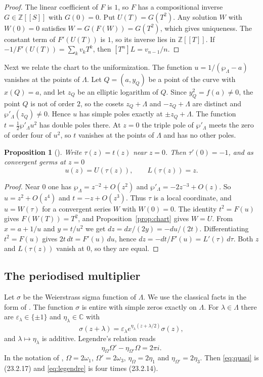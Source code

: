 \documentclass[11pt]{amsart}
\newtheorem{proposition}[theorem]{Proposition}
\theoremstyle{definition}
\theoremstyle{remark}
\numberwithin{equation}{section}
\newcommand{\Z}{\mathbb Z}
\newcommand{\C}{\mathbb C}
\begin{document}
\begin{proof}
The linear coefficient of $F$ is $1$, so $F$ has a compositional inverse $G\in\Z[[S]]$ with $G(0)=0$. Put
$U(T)=G(T^2)$. Any solution $W$ with $W(0)=0$ satisfies $W=G(F(W))=G(T^2)$, which gives uniqueness. The
constant term of $F'(U(T))$ is $1$, so its inverse lies in $\Z[[T]]$. If $-1/F'(U(T))=\sum_kv_kT^k$, then
$[T^n]L=v_{n-1}/n$.
\end{proof}

Next we relate the chart to the uniformization. The function $u=1/(\wp_\Lambda-a)$ vanishes at the points of
$\Lambda$. Let $Q=(a,y_Q)$ be a point of the curve with $x(Q)=a$, and let $z_Q$ be an elliptic logarithm of $Q$.
Since $y_Q^2=f(a)\ne0$, the point $Q$ is not of order $2$, so the cosets $z_Q+\Lambda$ and $-z_Q+\Lambda$ are
distinct and $\wp'_\Lambda(z_Q)\ne0$. Hence $u$ has simple poles exactly at $\pm z_Q+\Lambda$. The function
$t=\tfrac12\wp'_\Lambda u^2$ has double poles there. At $z=0$ the triple pole of $\wp'_\Lambda$ meets the
zero of order four of $u^2$, so $t$ vanishes at the points of $\Lambda$ and has no other poles.

\begin{proposition}[{\cite[Proposition~3.3]{ChudnovskyChudnovsky26}}]\label{prop:germ}
Write $\tau(z)=t(z)$ near $z=0$. Then $\tau'(0)=-1$, and as convergent germs at $z=0$
\[
 u(z)=U(\tau(z)),\qquad L(\tau(z))=z.
\]
\end{proposition}

\begin{proof}
Near $0$ one has $\wp_\Lambda=z^{-2}+O(z^2)$ and $\wp'_\Lambda=-2z^{-3}+O(z)$. So $u=z^2+O(z^4)$ and
$t=-z+O(z^3)$. Thus $\tau$ is a local coordinate, and $u=W(\tau)$ for a convergent series $W$ with $W(0)=0$.
The identity $t^2=F(u)$ gives $F(W(T))=T^2$, and Proposition~\ref{prop:chart} gives $W=U$. From
$x=a+1/u$ and $y=t/u^2$ we get $dz=dx/(2y)=-du/(2t)$. Differentiating $t^2=F(u)$ gives $2t\,dt=F'(u)\,du$,
hence $dz=-dt/F'(u)=L'(\tau)\,d\tau$. Both $z$ and $L(\tau(z))$ vanish at $0$, so they are equal.
\end{proof}

\subsection{The periodised multiplier}
Let $\sigma$ be the Weierstrass sigma function of $\Lambda$. We use the classical
facts in the form of \cite[Section~23.2]{DLMF}. The function $\sigma$ is entire with simple zeros exactly on
$\Lambda$. For $\lambda\in\Lambda$ there are $\varepsilon_\lambda\in\{\pm1\}$ and $\eta_\lambda\in\C$ with
\begin{equation}\label{eq:quasi}
 \sigma(z+\lambda)=\varepsilon_\lambda e^{\eta_\lambda(z+\lambda/2)}\sigma(z),
\end{equation}
and $\lambda\mapsto\eta_\lambda$ is additive. Legendre's relation reads
\begin{equation}\label{eq:legendre}
 \eta_\Omega\Omega'-\eta_{\Omega'}\Omega=2\pi i.
\end{equation}
In the notation of \cite{DLMF}, $\Omega=2\omega_1$, $\Omega'=2\omega_3$, $\eta_\Omega=2\eta_1$ and
$\eta_{\Omega'}=2\eta_3$. Then \eqref{eq:quasi} is (23.2.17) and \eqref{eq:legendre} is four times (23.2.14).
\end{document}

